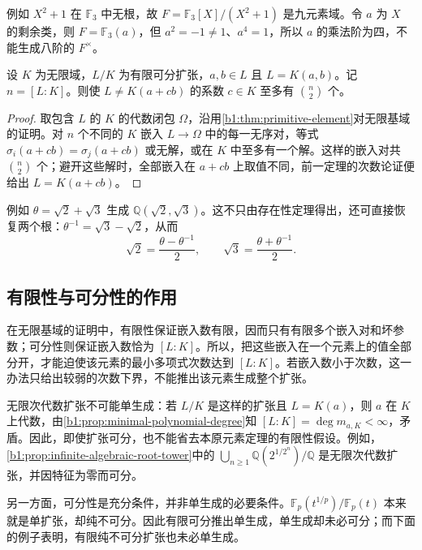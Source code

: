 \ProseParagraphBreak
例如 \(X^2+1\) 在 \(\mathbb F_3\) 中无根，故 \(F=\mathbb F_3[X]/(X^2+1)\) 是九元素域。令 \(a\) 为 \(X\) 的剩余类，则 \(F=\mathbb F_3(a)\)，但 \(a^2=-1\ne1\)、\(a^4=1\)，所以 \(a\) 的乘法阶为四，不能生成八阶的 \(F^\times\)。

\begin{corollary}\label{b1:prop:primitive-element-infinite}
	设 \(K\) 为无限域，\(L/K\) 为有限可分扩张，\(a,b\in L\) 且 \(L=K(a,b)\)。记 \(n=[L:K]\)。则使 \(L\ne K(a+cb)\) 的系数 \(c\in K\) 至多有 \(\binom{n}{2}\) 个。
\end{corollary}
\begin{proof}
	取包含 \(L\) 的 \(K\) 的代数闭包 \(\Omega\)，沿用\cref{b1:thm:primitive-element}对无限基域的证明。对 \(n\) 个不同的 \(K\) 嵌入 \(L\rightarrow\Omega\) 中的每一无序对，等式 \(\sigma_i(a+cb)=\sigma_j(a+cb)\) 或无解，或在 \(K\) 中至多有一个解。这样的嵌入对共 \(\binom{n}{2}\) 个；避开这些解时，全部嵌入在 \(a+cb\) 上取值不同，前一定理的次数论证便给出 \(L=K(a+cb)\)。
\end{proof}

例如 \(\theta=\sqrt2+\sqrt3\) 生成 \(\mathbb Q(\sqrt2,\sqrt3)\)。这不只由存在性定理得出，还可直接恢复两个根：\(\theta^{-1}=\sqrt3-\sqrt2\)，从而
\[
	\sqrt2=\frac{\theta-\theta^{-1}}2,\qquad \sqrt3=\frac{\theta+\theta^{-1}}2.
\]

\subsection{有限性与可分性的作用}
\label{b1:subsec:1604:02}

在无限基域的证明中，有限性保证嵌入数有限，因而只有有限多个嵌入对和坏参数；可分性则保证嵌入数恰为 \([L:K]\)。所以，把这些嵌入在一个元素上的值全部分开，才能迫使该元素的最小多项式次数达到 \([L:K]\)。若嵌入数小于次数，这一办法只给出较弱的次数下界，不能推出该元素生成整个扩张。

\ProseParagraphBreak
无限次代数扩张不可能单生成：若 \(L/K\) 是这样的扩张且 \(L=K(a)\)，则 \(a\) 在 \(K\) 上代数，由\cref{b1:prop:minimal-polynomial-degree}知 \([L:K]=\deg m_{a,K}<\infty\)，矛盾。因此，即使扩张可分，也不能省去本原元素定理的有限性假设。例如，\cref{b1:prop:infinite-algebraic-root-tower}中的 \(\bigcup_{n\geq1}\mathbb Q(2^{1/2^n})/\mathbb Q\) 是无限次代数扩张，并因特征为零而可分。

\ProseParagraphBreak
另一方面，可分性是充分条件，并非单生成的必要条件。\(\mathbb F_p(t^{1/p})/\mathbb F_p(t)\) 本来就是单扩张，却纯不可分。因此有限可分推出单生成，单生成却未必可分；而下面的例子表明，有限纯不可分扩张也未必单生成。

